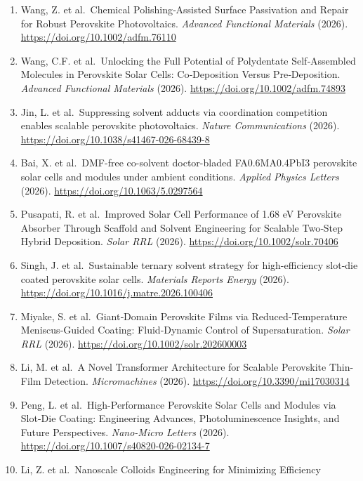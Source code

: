 \documentclass[
  11pt,
]{article}
\begin{document}
\begin{enumerate}
  Efficient and Stable Perovskite Solar Cells. \emph{Angewandte Chemie
  International Edition} (2026).
  \url{https://doi.org/10.1002/anie.9551164}
\item
  Wang, Z. et al.~Chemical Polishing‐Assisted Surface Passivation and
  Repair for Robust Perovskite Photovoltaics. \emph{Advanced Functional
  Materials} (2026). \url{https://doi.org/10.1002/adfm.76110}
\item
  Wang, C.F. et al.~Unlocking the Full Potential of Polydentate
  Self‐Assembled Molecules in Perovskite Solar Cells: Co‐Deposition
  Versus Pre‐Deposition. \emph{Advanced Functional Materials} (2026).
  \url{https://doi.org/10.1002/adfm.74893}
\item
  Jin, L. et al.~Suppressing solvent adducts via coordination
  competition enables scalable perovskite photovoltaics. \emph{Nature
  Communications} (2026).
  \url{https://doi.org/10.1038/s41467-026-68439-8}
\item
  Bai, X. et al.~DMF-free co-solvent doctor-bladed FA0.6MA0.4PbI3
  perovskite solar cells and modules under ambient conditions.
  \emph{Applied Physics Letters} (2026).
  \url{https://doi.org/10.1063/5.0297564}
\item
  Pusapati, R. et al.~Improved Solar Cell Performance of 1.68 eV
  Perovskite Absorber Through Scaffold and Solvent Engineering for
  Scalable Two‐Step Hybrid Deposition. \emph{Solar RRL} (2026).
  \url{https://doi.org/10.1002/solr.70406}
\item
  Singh, J. et al.~Sustainable ternary solvent strategy for
  high-efficiency slot-die coated perovskite solar cells.
  \emph{Materials Reports Energy} (2026).
  \url{https://doi.org/10.1016/j.matre.2026.100406}
\item
  Miyake, S. et al.~Giant‐Domain Perovskite Films via
  Reduced‐Temperature Meniscus‐Guided Coating: Fluid‐Dynamic Control of
  Supersaturation. \emph{Solar RRL} (2026).
  \url{https://doi.org/10.1002/solr.202600003}
\item
  Li, M. et al.~A Novel Transformer Architecture for Scalable Perovskite
  Thin-Film Detection. \emph{Micromachines} (2026).
  \url{https://doi.org/10.3390/mi17030314}
\item
  Peng, L. et al.~High-Performance Perovskite Solar Cells and Modules
  via Slot-Die Coating: Engineering Advances, Photoluminescence
  Insights, and Future Perspectives. \emph{Nano-Micro Letters} (2026).
  \url{https://doi.org/10.1007/s40820-026-02134-7}
\item
  Li, Z. et al.~Nanoscale Colloids Engineering for Minimizing Efficiency

\end{enumerate}
\end{document}
